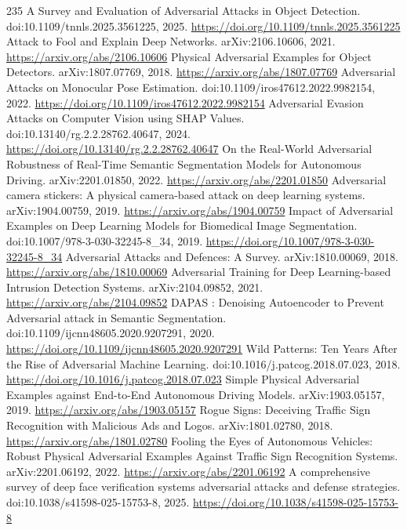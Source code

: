 \documentclass[11pt]{article}
\begin{document}
\begin{thebibliography}{235}
 A Survey and Evaluation of Adversarial Attacks in Object Detection. doi:10.1109/tnnls.2025.3561225, 2025. \url{https://doi.org/10.1109/tnnls.2025.3561225}
 Attack to Fool and Explain Deep Networks. arXiv:2106.10606, 2021. \url{https://arxiv.org/abs/2106.10606}
 Physical Adversarial Examples for Object Detectors. arXiv:1807.07769, 2018. \url{https://arxiv.org/abs/1807.07769}
 Adversarial Attacks on Monocular Pose Estimation. doi:10.1109/iros47612.2022.9982154, 2022. \url{https://doi.org/10.1109/iros47612.2022.9982154}
 Adversarial Evasion Attacks on Computer Vision using SHAP Values. doi:10.13140/rg.2.2.28762.40647, 2024. \url{https://doi.org/10.13140/rg.2.2.28762.40647}
 On the Real-World Adversarial Robustness of Real-Time Semantic Segmentation Models for Autonomous Driving. arXiv:2201.01850, 2022. \url{https://arxiv.org/abs/2201.01850}
 Adversarial camera stickers: A physical camera-based attack on deep learning systems. arXiv:1904.00759, 2019. \url{https://arxiv.org/abs/1904.00759}
 Impact of Adversarial Examples on Deep Learning Models for Biomedical Image Segmentation. doi:10.1007/978-3-030-32245-8\_34, 2019. \url{https://doi.org/10.1007/978-3-030-32245-8_34}
 Adversarial Attacks and Defences: A Survey. arXiv:1810.00069, 2018. \url{https://arxiv.org/abs/1810.00069}
 Adversarial Training for Deep Learning-based Intrusion Detection Systems. arXiv:2104.09852, 2021. \url{https://arxiv.org/abs/2104.09852}
 DAPAS : Denoising Autoencoder to Prevent Adversarial attack in Semantic Segmentation. doi:10.1109/ijcnn48605.2020.9207291, 2020. \url{https://doi.org/10.1109/ijcnn48605.2020.9207291}
 Wild Patterns: Ten Years After the Rise of Adversarial Machine Learning. doi:10.1016/j.patcog.2018.07.023, 2018. \url{https://doi.org/10.1016/j.patcog.2018.07.023}
 Simple Physical Adversarial Examples against End-to-End Autonomous Driving Models. arXiv:1903.05157, 2019. \url{https://arxiv.org/abs/1903.05157}
 Rogue Signs: Deceiving Traffic Sign Recognition with Malicious Ads and Logos. arXiv:1801.02780, 2018. \url{https://arxiv.org/abs/1801.02780}
 Fooling the Eyes of Autonomous Vehicles: Robust Physical Adversarial Examples Against Traffic Sign Recognition Systems. arXiv:2201.06192, 2022. \url{https://arxiv.org/abs/2201.06192}
 A comprehensive survey of deep face verification systems adversarial attacks and defense strategies. doi:10.1038/s41598-025-15753-8, 2025. \url{https://doi.org/10.1038/s41598-025-15753-8}

\end{thebibliography}
\end{document}
